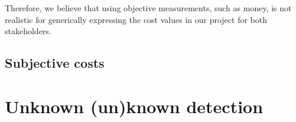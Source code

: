 Therefore, we believe that using objective measurements, such as money, is not realistic for generically expressing the cost values in our project for both stakeholders.

\subsection{Subjective costs}


\section{Unknown (un)known detection}

